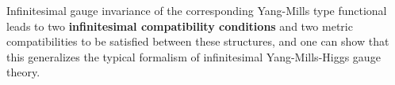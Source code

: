 \documentclass[a4paper,oneside,11pt]{scrartcl} %
\def\bas#1\eas{\begin{align*}#1\end{align*}}
\theoremstyle{plain}
\theoremstyle{remark}
\theoremstyle{definition}
\begin{document}
Infinitesimal gauge invariance of the corresponding Yang-Mills type functional leads to two \textbf{infinitesimal compatibility conditions} and two metric compatibilities to be satisfied between these structures, and one can show that this generalizes the typical formalism of infinitesimal Yang-Mills-Higgs gauge theory.
%
%
%
%
\end{document}
